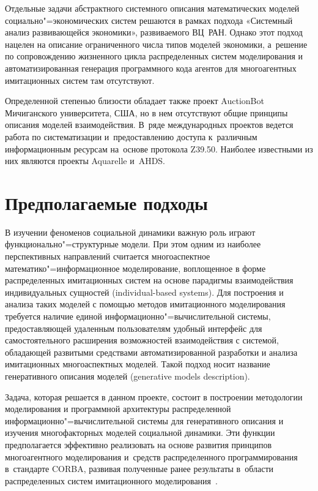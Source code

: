\documentclass[twoside]{article}
\begin{document}
Отдельные задачи
абстрактного системного описания математических моделей социально"=экономических
систем решаются в рамках подхода «Системный анализ развивающейся экономики»,
развиваемого ВЦ~РАН. Однако этот подход нацелен на описание ограниченного числа
типов моделей экономики, а~решение по сопровождению жизненного цикла распределенных
систем моделирования и автоматизированная генерация программного кода агентов
для многоагентных имитационных систем там отсутствуют.

Определенной степенью
близости обладает также проект AuctionBot Мичиганского университета, США, но
в нем отсутствуют общие принципы описания моделей взаимодействия.
В~ряде международных проектов ведется работа по систематизации
и~предоставлению доступа к~различным информационным ресурсам
на~основе протокола Z39.50.
Наиболее известными из них являются проекты Aquarelle и~AHDS.

\section{Предполагаемые подходы}

В изучении феноменов социальной динамики
важную роль играют функционально"=структурные модели.
При этом одним из наиболее перспективных направлений считается
многоаспектное математико"=информационное моделирование,
воплощенное в форме распределенных имитационных систем
на основе парадигмы взаимодействия индивидуальных сущностей (individual-based systems).
Для построения и анализа таких моделей
с помощью методов имитационного моделирования
требуется наличие единой информационно"=вычислительной системы,
предоставляющей удаленным пользователям удобный интерфейс
для самостоятельного расширения возможностей взаимодействия с системой,
обладающей развитыми средствами автоматизированной разработки и анализа
имитационных многоаспектных моделей.
Такой подход носит название генеративного описания моделей
(generative models description).

Задача, которая решается в данном проекте,
состоит в построении методологии моделирования и программной архитектуры
распределенной информационно"=вычислительной системы
для генеративного описания и изучения
многофакторных моделей социальной динамики.
Эти функции предполагается эффективно реализовать
на основе развития принципов многоагентного моделирования
и~средств распределенного программирования в~стандарте CORBA,
развивая полученные ранее результаты в~области
распределенных систем имитационного моделирования~\cite{2,3}.
\end{document}
